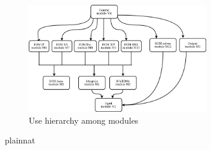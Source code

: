 \documentclass[12pt, titlepage]{article}
\begin{document}
\begin{figure}[H]
\centering
\includegraphics[width=0.7\textwidth]{UsesHierarchy.png}
\caption{Use hierarchy among modules}
\label{FigUH}
\end{figure}


 {plainnat}

\end{document}
